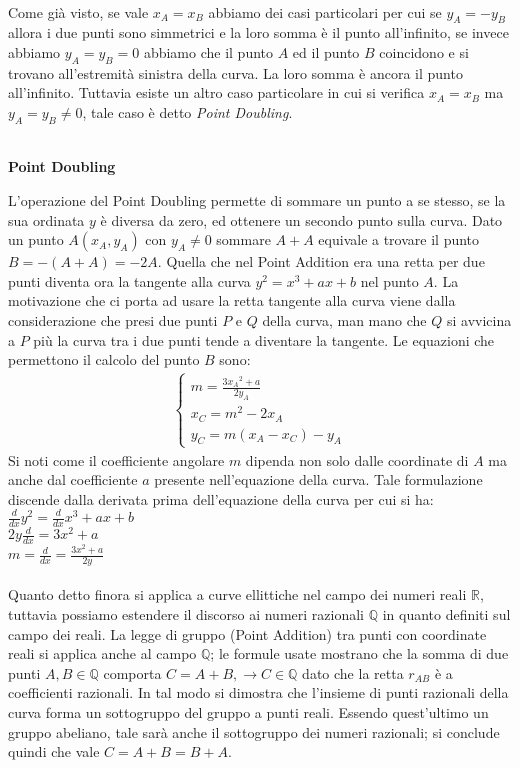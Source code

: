 \documentclass[a4paper,12pt]{tesiinfo}
\begin{document}
\\
Come gi\`a visto, se vale $x_A = x_B$ abbiamo dei casi particolari per cui se $y_A = -y_B$ allora i due punti sono simmetrici e la loro somma \`e il punto all'infinito, se invece abbiamo $y_A = y_B = 0$ abbiamo che il punto $A$ ed il punto $B$ coincidono e si trovano all'estremit\`a sinistra della curva. La loro somma \`e ancora il punto all'infinito. Tuttavia esiste un altro caso particolare in cui si verifica $x_A = x_B$ ma $y_A = y_B \ne 0$, tale caso \`e detto \textit{Point Doubling}.
\\
\\
\begin{center}
\textbf{Point Doubling}
\end{center}
L'operazione del Point Doubling permette di sommare un punto a se stesso, se la sua ordinata $y$ \`e diversa da zero, ed ottenere un secondo punto sulla curva. Dato un punto $A(x_A, y_A)$ con $y_A \ne 0$ sommare $A+A$ equivale a trovare il punto $B = -(A+A) = -2A$. Quella che nel Point Addition era una retta per due punti diventa ora la tangente alla curva $y^2 = x^3 + ax +b$ nel punto $A$. La motivazione che ci porta ad usare la retta tangente alla curva viene dalla considerazione che presi due punti $P$ e $Q$ della curva, man mano che $Q$ si avvicina a $P$ pi\`u la curva tra i due punti tende a diventare la tangente. Le equazioni che permettono il calcolo del punto $B$ sono:
\begin{align*}
\begin{cases}
m = \frac{3{x_A}^2 + a}{2y_A}\\
x_C = m^2 - 2x_A\\
y_C = m(x_A - x_C)-y_A
\end{cases}
\end{align*}
Si noti come il coefficiente angolare $m$ dipenda non solo dalle coordinate di $A$ ma anche dal coefficiente $a$ presente nell'equazione della curva. Tale formulazione discende dalla derivata prima dell'equazione della curva per cui si ha:
$\frac{d}{dx}y^2 = \frac{d}{dx}x^3 + ax + b$\\
$2y\frac{d}{dx} = 3x^2 + a$\\
$m = \frac{d}{dx} = \frac{3x^2 + a}{2y}$
\\
\\
Quanto detto finora si applica a curve ellittiche nel campo dei numeri reali $\mathbb{R}$, tuttavia possiamo estendere il discorso ai numeri razionali $\mathbb{Q}$ in quanto definiti sul campo dei reali. La legge di gruppo (Point Addition) tra punti con coordinate reali si applica anche al campo $\mathbb{Q}$; le formule usate mostrano che la somma di due punti $A, B \in \mathbb{Q}$ comporta $C = A + B, \to C \in \mathbb{Q}$ dato che la retta $r_{AB}$ \`e a coefficienti razionali. In tal modo si dimostra che l'insieme di punti razionali della curva forma un sottogruppo del gruppo a punti reali. Essendo quest'ultimo un gruppo abeliano, tale sar\`a anche il sottogruppo dei numeri razionali; si conclude quindi che vale $C = A+B = B+A$.
\end{document}
